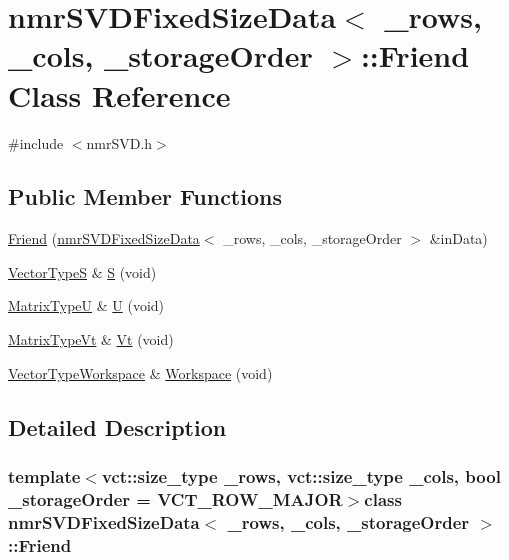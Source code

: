 \hypertarget{classnmr_s_v_d_fixed_size_data_1_1_friend}{\section{nmr\-S\-V\-D\-Fixed\-Size\-Data$<$ \-\_\-rows, \-\_\-cols, \-\_\-storage\-Order $>$\-:\-:Friend Class Reference}
\label{classnmr_s_v_d_fixed_size_data_1_1_friend}
}


{\ttfamily \#include $<$nmr\-S\-V\-D.\-h$>$}

\subsection*{Public Member Functions}
\begin{DoxyCompactItemize}
\item 
\hyperlink{classnmr_s_v_d_fixed_size_data_1_1_friend_aa1ebb3b55ee9daf9678376b774c7017c}{Friend} (\hyperlink{classnmr_s_v_d_fixed_size_data}{nmr\-S\-V\-D\-Fixed\-Size\-Data}$<$ \-\_\-rows, \-\_\-cols, \-\_\-storage\-Order $>$ \&in\-Data)
\item 
\hyperlink{classnmr_s_v_d_fixed_size_data_ad9ec4977d4726118af8c7bce3d18b752}{Vector\-Type\-S} \& \hyperlink{classnmr_s_v_d_fixed_size_data_1_1_friend_a8184b00231bcd319b35840c2df86edae}{S} (void)
\item 
\hyperlink{classnmr_s_v_d_fixed_size_data_a164bbc8eccf8b1102d5a85dde45de99d}{Matrix\-Type\-U} \& \hyperlink{classnmr_s_v_d_fixed_size_data_1_1_friend_a85f601c76e92743aaaa50aa868047167}{U} (void)
\item 
\hyperlink{classnmr_s_v_d_fixed_size_data_ab9a7c396f7a83256d5e8c789b3a23591}{Matrix\-Type\-Vt} \& \hyperlink{classnmr_s_v_d_fixed_size_data_1_1_friend_a90ac8632c5537dc4e6def8a117e0ae64}{Vt} (void)
\item 
\hyperlink{classnmr_s_v_d_fixed_size_data_a82162baa88dba7eb39bb52b71435aaa9}{Vector\-Type\-Workspace} \& \hyperlink{classnmr_s_v_d_fixed_size_data_1_1_friend_aa2d609df6ff7790a9600485f7c1b2d7f}{Workspace} (void)
\end{DoxyCompactItemize}


\subsection{Detailed Description}
\subsubsection*{template$<$vct\-::size\-\_\-type \-\_\-rows, vct\-::size\-\_\-type \-\_\-cols, bool \-\_\-storage\-Order = V\-C\-T\-\_\-\-R\-O\-W\-\_\-\-M\-A\-J\-O\-R$>$class nmr\-S\-V\-D\-Fixed\-Size\-Data$<$ \-\_\-rows, \-\_\-cols, \-\_\-storage\-Order $>$\-::\-Friend}

